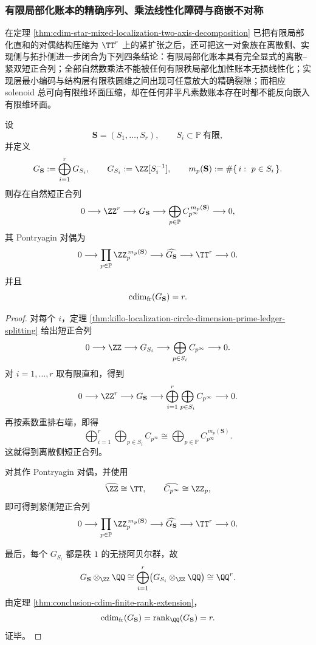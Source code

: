 \subsubsection{有限局部化账本的精确序列、乘法线性化障碍与商嵌不对称}\label{subsubsec:cdim-finite-localization-ledger-gap-rigidity}
在定理 \ref{thm:cdim-star-mixed-localization-two-axis-decomposition} 已把有限局部化直和的对偶结构压缩为 \(\TT^r\) 上的紧扩张之后，还可把这一对象族在离散侧、实现侧与拓扑侧进一步闭合为下列四条结论：有限局部化账本具有完全显式的离散--紧双短正合列；全部自然数乘法不能被任何有限秩局部化加性账本无损线性化；实现层最小编码与结构层有限秩圆维之间出现可任意放大的精确裂隙；而相应 solenoid 总可向有限维环面压缩，却在任何非平凡素数账本存在时都不能反向嵌入有限维环面。

\begin{theorem}[有限局部化直和的素数账本精确序列与有限秩圆维]\label{thm:cdim-finite-localization-directsum-prime-ledger-exact-sequence}
设
\[
\mathbf S=(S_1,\dots,S_r),
\qquad
S_i\subset\mathbb P\ \text{有限},
\]
并定义
\[
G_{\mathbf S}:=\bigoplus_{i=1}^{r}G_{S_i},
\qquad
G_{S_i}:=\ZZ[S_i^{-1}],
\qquad
m_p(\mathbf S):=\#\{\,i:\ p\in S_i\,\}.
\]
则存在自然短正合列
\[
0\longrightarrow \ZZ^r\longrightarrow G_{\mathbf S}
\longrightarrow \bigoplus_{p\in\mathbb P}C_{p^\infty}^{\,m_p(\mathbf S)}
\longrightarrow 0,
\]
其 Pontryagin 对偶为
\[
0\longrightarrow \prod_{p\in\mathbb P}\ZZ_p^{\,m_p(\mathbf S)}
\longrightarrow \widehat{G_{\mathbf S}}
\longrightarrow \TT^r
\longrightarrow 0.
\]
并且
\[
\operatorname{cdim}_{\mathrm{fr}}(G_{\mathbf S})=r.
\]
\end{theorem}
\begin{proof}
对每个 \(i\)，定理 \ref{thm:killo-localization-circle-dimension-prime-ledger-splitting} 给出短正合列
\[
0\longrightarrow \ZZ\longrightarrow G_{S_i}
\longrightarrow \bigoplus_{p\in S_i}C_{p^\infty}
\longrightarrow 0.
\]
对 \(i=1,\dots,r\) 取有限直和，得到
\[
0\longrightarrow \ZZ^r\longrightarrow G_{\mathbf S}
\longrightarrow \bigoplus_{i=1}^{r}\bigoplus_{p\in S_i}C_{p^\infty}
\longrightarrow 0.
\]
再按素数重排右端，即得
\[
\bigoplus_{i=1}^{r}\bigoplus_{p\in S_i}C_{p^\infty}
\cong
\bigoplus_{p\in\mathbb P}C_{p^\infty}^{\,m_p(\mathbf S)}.
\]
这就得到离散侧短正合列。

对其作 Pontryagin 对偶，并使用
\[
\widehat{\ZZ}\cong\TT,
\qquad
\widehat{C_{p^\infty}}\cong \ZZ_p,
\]
即可得到紧侧短正合列
\[
0\longrightarrow \prod_{p\in\mathbb P}\ZZ_p^{\,m_p(\mathbf S)}
\longrightarrow \widehat{G_{\mathbf S}}
\longrightarrow \TT^r
\longrightarrow 0.
\]

最后，每个 \(G_{S_i}\) 都是秩 \(1\) 的无挠阿贝尔群，故
\[
G_{\mathbf S}\otimes_{\ZZ}\QQ
\cong
\bigoplus_{i=1}^{r}\bigl(G_{S_i}\otimes_{\ZZ}\QQ\bigr)
\cong
\QQ^r.
\]
由定理 \ref{thm:conclusion-cdim-finite-rank-extension}，
\[
\cdim_{\mathrm{fr}}(G_{\mathbf S})
=
\operatorname{rank}_{\QQ}(G_{\mathbf S})
=
r.
\]
证毕。
\end{proof}

